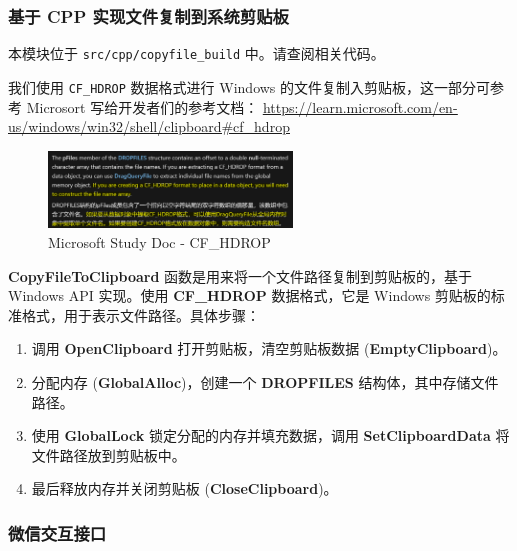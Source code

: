 \documentclass[14pt,a4paper,UTF8,twoside]{article}
\begin{document}
    \subsubsection{基于 CPP 实现文件复制到系统剪贴板}

    \begin{note}
        本模块位于 \texttt{src/cpp/copyfile\_build} 中。请查阅相关代码。

        我们使用 \texttt{CF\_HDROP} 数据格式进行 Windows 的文件复制入剪贴板，这一部分可参考 Microsort 写给开发者们的参考文档：
        \href{https://learn.microsoft.com/en-us/windows/win32/shell/clipboard#cf_hdrop}{\underline{https://learn.microsoft.com/en-us/windows/win32/shell/clipboard\#cf\_hdrop}}
    \end{note}

    \begin{figure}[H]
        \centering
        \includegraphics[width=0.578\textwidth]{img/CF_HDROP.png}
        \caption{Microsoft Study Doc - CF\_HDROP}
        \label{fig:copyfile_to_clipboard}
    \end{figure}

    \textbf{CopyFileToClipboard} 函数是用来将一个文件路径复制到剪贴板的，基于 Windows API 实现。使用 \textbf{CF\_HDROP} 数据格式，它是 Windows 剪贴板的标准格式，用于表示文件路径。具体步骤：

    \begin{enumerate}
        \item 调用 \textbf{OpenClipboard} 打开剪贴板，清空剪贴板数据 (\textbf{EmptyClipboard})。
        \item 分配内存 (\textbf{GlobalAlloc})，创建一个 \textbf{DROPFILES} 结构体，其中存储文件路径。
        \item 使用 \textbf{GlobalLock} 锁定分配的内存并填充数据，调用 \textbf{SetClipboardData} 将文件路径放到剪贴板中。
        \item 最后释放内存并关闭剪贴板 (\textbf{CloseClipboard})。
    \end{enumerate}

    \subsubsection{微信交互接口}
\end{document}
